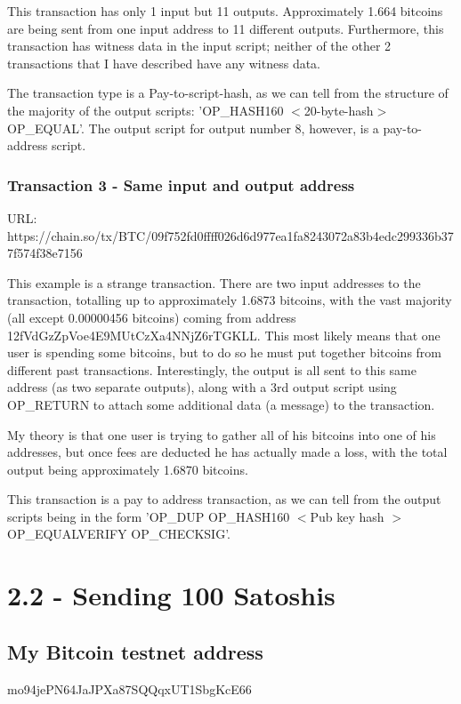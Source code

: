\documentclass[11pt]{article}
\begin{document}
	This transaction has only 1 input but 11 outputs. Approximately 1.664 bitcoins are being sent from one input address to 11 different outputs. Furthermore, this transaction has witness data in the input script; neither of the other 2 transactions that I have described have any witness data.
	
	The transaction type is a Pay-to-script-hash, as we can tell from the structure of the majority of the output scripts: 'OP\_HASH160 $<$20-byte-hash$>$ OP\_EQUAL'. The output script for output number 8, however, is a pay-to-address script.
	
	\subsubsection*{Transaction 3 - Same input and output address}
	URL: https://chain.so/tx/BTC/09f752fd0ffff026d6d977ea1fa8243072a83b4edc299336b377f574f38e7156 \newline
	
	This example is a strange transaction. There are two input addresses to the transaction, totalling up to approximately 1.6873 bitcoins, with the vast majority (all except 0.00000456 bitcoins) coming from address 12fVdGzZpVoe4E9MUtCzXa4NNjZ6rTGKLL. This most likely means that one user is spending some bitcoins, but to do so he must put together bitcoins from different past transactions. Interestingly, the output is all sent to this same address (as two separate outputs), along with a 3rd output script using OP\_RETURN to attach some additional data (a message) to the transaction.
	
	My theory is that one user is trying to gather all of his bitcoins into one of his addresses, but once fees are deducted he has actually made a loss, with the total output being approximately 1.6870 bitcoins.
	
	This transaction is a pay to address transaction, as we can tell from the output scripts being in the form 'OP\_DUP OP\_HASH160 $<$Pub key hash $>$ OP\_EQUALVERIFY OP\_CHECKSIG'.
	
	\newpage
	
	
	\section*{2.2 - Sending 100 Satoshis}
	\subsection*{My Bitcoin testnet address}
	mo94jePN64JaJPXa87SQQqxUT1SbgKcE66
	
\end{document}
